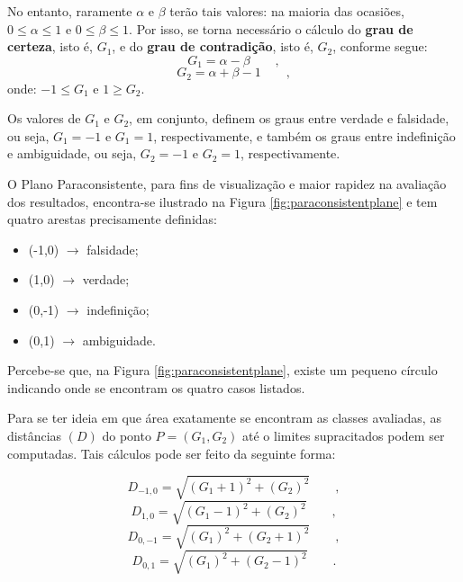 				\par No entanto, raramente $\alpha$ e $\beta$ terão tais valores: na maioria das ocasiões, $0 \leqslant \alpha \leqslant 1$ e $0 \leqslant \beta \leqslant 1$. Por isso, se torna necessário o cálculo do \textbf{grau de certeza}, isto é, $G_1$, e do \textbf{grau de contradição}, isto é, $G_2$, conforme segue:
				\begin{equation}
					G_1=\alpha-\beta  \qquad,
				\end{equation}
				\begin{equation}
					G_2=\alpha+\beta-1 \qquad,
				\end{equation}
			onde: $-1 \leqslant G_1$ e  $1 \geqslant G_2$.

			\par Os valores de $G_1$ e $G_2$, em conjunto, definem os graus entre verdade e falsidade, ou seja, $G_1=-1$ e $G_1=1$, respectivamente, e também os graus entre indefinição e ambiguidade, ou seja, $G_2=-1$ e $G_2=1$, respectivamente.
		
			\par O Plano Paraconsistente, para fins de visualização e maior rapidez na avaliação dos resultados, encontra-se ilustrado na Figura \ref{fig:paraconsistentplane} e tem quatro arestas precisamente definidas:
			\begin{itemize}
				\item (-1,0) $\rightarrow$ falsidade;
				\item (1,0) $\rightarrow$ verdade;
				\item (0,-1) $\rightarrow$ indefinição;
				\item (0,1) $\rightarrow$ ambiguidade.
			\end{itemize}
			\par Percebe-se que, na Figura \ref{fig:paraconsistentplane}, existe um pequeno círculo indicando onde se encontram os quatro casos listados.
	
			\par Para se ter ideia em que área exatamente se encontram as classes avaliadas, as distâncias $(D)$ do ponto $P=(G_1,G_2)$ até o limites supracitados podem ser computadas. Tais cálculos pode ser feito da seguinte forma:

			\begin{equation}
				D_{-1,0}=\sqrt{(G_1+1)^2+(G_2)^2}\qquad,
			\end{equation}
			\begin{equation}
				D_{1,0}=\sqrt{(G_1-1)^2+(G_2)^2}\qquad,
			\end{equation}
			\begin{equation}
				D_{0,-1}=\sqrt{(G_1)^2+(G_2+1)^2}\qquad,		
			\end{equation}
			\begin{equation}
				D_{0,1}=\sqrt{(G_1)^2+(G_2-1)^2}\qquad.
			\end{equation}		


